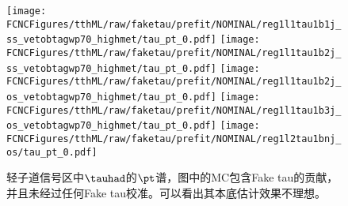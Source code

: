 \begin{figure}[H]
\centering
\texttt{[image: \\FCNCFigures/tthML/raw/faketau/prefit/NOMINAL/reg1l1tau1b1j\_ss\_vetobtagwp70\_highmet/tau\_pt\_0.pdf]}
\texttt{[image: \\FCNCFigures/tthML/raw/faketau/prefit/NOMINAL/reg1l1tau1b2j\_ss\_vetobtagwp70\_highmet/tau\_pt\_0.pdf]}
\texttt{[image: \\FCNCFigures/tthML/raw/faketau/prefit/NOMINAL/reg1l1tau1b2j\_os\_vetobtagwp70\_highmet/tau\_pt\_0.pdf]}
\texttt{[image: \\FCNCFigures/tthML/raw/faketau/prefit/NOMINAL/reg1l1tau1b3j\_os\_vetobtagwp70\_highmet/tau\_pt\_0.pdf]}
\texttt{[image: \\FCNCFigures/tthML/raw/faketau/prefit/NOMINAL/reg1l2tau1bnj\_os/tau\_pt\_0.pdf]}

\caption{轻子道信号区中$\tauhad$的$\pt$谱，图中的MC包含Fake tau的贡献，并且未经过任何Fake tau校准。可以看出其本底估计效果不理想。 }
\label{fig:pt_raw}
\end{figure}
